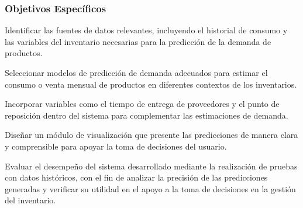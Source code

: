 \subsubsection{Objetivos Específicos}

Identificar las fuentes de datos relevantes, incluyendo el historial de consumo y las variables del inventario necesarias para la predicción de la demanda de productos.

Seleccionar modelos de predicción de demanda adecuados para estimar el consumo o venta mensual de productos en diferentes contextos de los inventarios.

Incorporar variables como el tiempo de entrega de proveedores y el punto de reposición dentro del sistema para complementar las estimaciones de demanda.

Diseñar un módulo de visualización que presente las predicciones de manera clara y comprensible para apoyar la toma de decisiones del usuario.

Evaluar el desempeño del sistema desarrollado mediante la realización de pruebas con datos históricos, con el fin de analizar la precisión de las predicciones generadas y verificar su utilidad en el apoyo a la toma de decisiones en la gestión del inventario.